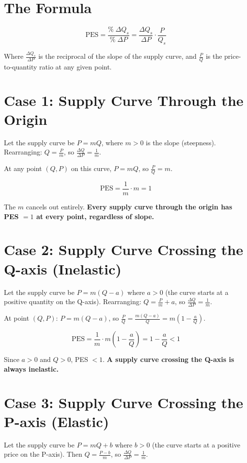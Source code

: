 \documentclass[11pt, a4paper, twoside]{book}
\begin{document}
\section*{The Formula}

\[
\text{PES} = \frac{\%\;\Delta Q_s}{\%\;\Delta P} = \frac{\Delta Q_s}{\Delta P} \cdot \frac{P}{Q_s}
\]

Where $\frac{\Delta Q_s}{\Delta P}$ is the reciprocal of the slope of the supply curve, and $\frac{P}{Q}$ is the price-to-quantity ratio at any given point.

\section*{Case 1: Supply Curve Through the Origin}

Let the supply curve be $P = mQ$, where $m > 0$ is the slope (steepness). Rearranging: $Q = \frac{P}{m}$, so $\frac{\Delta Q}{\Delta P} = \frac{1}{m}$.

At any point $(Q, P)$ on this curve, $P = mQ$, so $\frac{P}{Q} = m$.

\[
\text{PES} = \frac{1}{m} \cdot m = 1
\]

The $m$ cancels out entirely. \textbf{Every supply curve through the origin has PES $= 1$ at every point, regardless of slope.}

\section*{Case 2: Supply Curve Crossing the Q-axis (Inelastic)}

Let the supply curve be $P = m(Q - a)$ where $a > 0$ (the curve starts at a positive quantity on the Q-axis). Rearranging: $Q = \frac{P}{m} + a$, so $\frac{\Delta Q}{\Delta P} = \frac{1}{m}$.

At point $(Q, P)$: $P = m(Q - a)$, so $\frac{P}{Q} = \frac{m(Q-a)}{Q} = m\left(1 - \frac{a}{Q}\right)$.

\[
\text{PES} = \frac{1}{m} \cdot m\left(1 - \frac{a}{Q}\right) = 1 - \frac{a}{Q} < 1
\]

Since $a > 0$ and $Q > 0$, PES $< 1$. \textbf{A supply curve crossing the Q-axis is always inelastic.}

\section*{Case 3: Supply Curve Crossing the P-axis (Elastic)}

Let the supply curve be $P = mQ + b$ where $b > 0$ (the curve starts at a positive price on the P-axis). Then $Q = \frac{P - b}{m}$, so $\frac{\Delta Q}{\Delta P} = \frac{1}{m}$.
\end{document}
